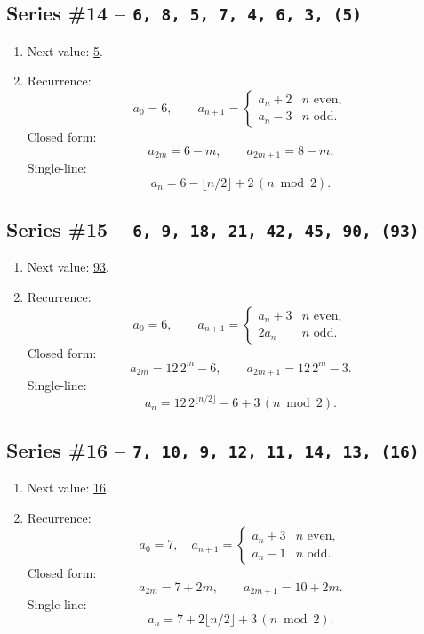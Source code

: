 \documentclass{sn-jnl}
\theoremstyle{definition}
\newcommand{\seq}[1]{\texttt{#1}}
\newcommand{\nextval}[1]{\underline{#1}}
\begin{document}
{%
\subsection*{Series \#14 -- \seq{6,\,8,\,5,\,7,\,4,\,6,\,3,\,(5)}}
\begin{enumerate}[label=(\alph*)]
  \item Next value: \nextval{5}.
  \item Recurrence:
  \[
    a_0=6,\qquad a_{n+1}=\begin{cases}a_n+2 & n\text{ even},\\[4pt]a_n-3 & n\text{ odd} .\end{cases}
  \]
  Closed form:
  \[
    a_{2m}=6-m,\qquad a_{2m+1}=8-m.
  \]
  Single‑line:
  \[a_n = 6-\lfloor n/2\rfloor+2\,(n\bmod 2).\]
\end{enumerate}

\subsection*{Series \#15 -- \seq{6,\,9,\,18,\,21,\,42,\,45,\,90,\,(93)}}
\begin{enumerate}[label=(\alph*)]
  \item Next value: \nextval{93}.
  \item Recurrence:
  \[
    a_0=6,\qquad a_{n+1}=\begin{cases}a_n+3 & n\text{ even},\\[4pt]2a_n & n\text{ odd}.\end{cases}
  \]
  Closed form:
  \[
    a_{2m}=12\,2^{m}-6,\qquad a_{2m+1}=12\,2^{m}-3.
  \]
  Single‑line:
  \[a_n = 12\,2^{\lfloor n/2\rfloor}-6+3\,(n\bmod 2).\]
\end{enumerate}

\subsection*{Series \#16 -- \seq{7,\,10,\,9,\,12,\,11,\,14,\,13,\,(16)}}
\begin{enumerate}[label=(\alph*)]
  \item Next value: \nextval{16}.
  \item Recurrence:
  \[
    a_0=7,\quad a_{n+1}=\begin{cases}a_n+3 & n\text{ even},\\[4pt]a_n-1 & n\text{ odd}.\end{cases}
  \]
  Closed form:
  \[
    a_{2m}=7+2m,\qquad a_{2m+1}=10+2m.
  \]
  Single‑line:
  \[a_n = 7+2\lfloor n/2\rfloor+3\,(n\bmod 2).\]
\end{enumerate}

}
\end{document}
